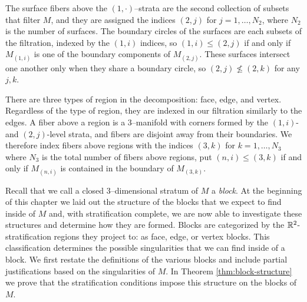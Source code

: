 The surface fibers above the $(1,\cdot)$--strata are the second collection of subsets that filter $M$, and they are assigned the indices $(2,j)$ for $j=1,\dots, N_2$, where $N_2$ is the number of surfaces.
The boundary circles of the surfaces are each subsets of the filtration, indexed by the $(1,i)$ indices, so $(1,i)\leq (2,j)$ if and only if $M_{(1,i)}$ is one of the boundary components of $M_{(2,j)}$.
These surfaces intersect one another only when they share a boundary circle, so $(2,j)\nleq (2,k)$ for any $j,k$.

There are three types of region in the decomposition: face, edge, and vertex.
Regardless of the type of region, they are indexed in our filtration similarly to the edges.
A fiber above a region is a 3--manifold with corners formed by the $(1,i)$- and $(2,j)$-level strata, and fibers are disjoint away from their boundaries.
We therefore index fibers above regions with the indices $(3,k)$ for $k=1,\dots, N_3$ where $N_3$ is the total number of fibers above regions, put $(n,i)\leq (3,k)$ if and only if $M_{(n,i)}$ is contained in the boundary of $M_{(3,k)}$.

Recall that we call a closed 3--dimensional stratum of $M$ a \emph{block}.
At the beginning of this chapter we laid out the structure of the blocks that we expect to find inside of $M$ and, with stratification complete, we are now able to investigate these structures and determine how they are formed.
Blocks are categorized by the $\mathbb{R}^2$-stratification regions they project to: as face, edge, or vertex blocks.
This classification determines the possible singularities that we can find inside of a block.
We first restate the definitions of the various blocks and include partial justifications based on the singularities of $M$.
In Theorem \ref{thm:block-structure} we prove that the stratification conditions impose this structure on the blocks of $M$.


